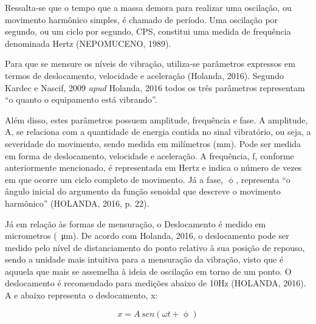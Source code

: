 \documentclass[
	12pt,				
	oneside,			
	a4paper,			
	english,			
	brazil,			
	]{abntex2ppgsi}
\begin{document}
Ressalta-se que o tempo que a massa demora para realizar uma oscilação, ou movimento harmônico simples, é chamado de período. Uma oscilação por segundo, ou um ciclo por segundo, CPS, constitui uma medida de frequência denominada Hertz (NEPOMUCENO, 1989). 



Para que se mensure os níveis de vibração, utiliza-se parâmetros expressos em termos de deslocamento, velocidade e aceleração (Holanda, 2016). Segundo Kardec e Nascif, 2009 \textit{apud} Holanda, 2016 todos os três parâmetros representam “o quanto o equipamento está vibrando”. 

Além disso, estes parâmetros possuem amplitude, frequência e fase. A amplitude, A, se relaciona com a quantidade de energia contida no sinal vibratório, ou seja, a severidade do movimento, sendo medida em milímetros (mm). Pode ser medida em forma de deslocamento, velocidade e aceleração. A frequência, f, conforme anteriormente mencionado, é representada em Hertz e indica o número de vezes em que ocorre um ciclo completo de movimento. Já a fase, $\upphi$, representa “o ângulo inicial do argumento da função senoidal que descreve o movimento harmônico” (HOLANDA, 2016, p. 22).

Já em relação às formas de mensuração, o Deslocamento é medido em micrometros (\SI{}{\micro\metre}). De acordo com Holanda, 2016, o deslocamento pode ser medido pelo nível de distanciamento do ponto relativo à sua posição de repouso, sendo a unidade mais intuitiva para a mensuração da vibração, visto que é aquuela que mais se assemelha à ideia de oscilação em torno de um ponto. O deslocamento é recomendado para medições abaixo de 10Hz (HOLANDA, 2016). A e abaixo representa o deslocamento, x:

\begin{equation}
	x = A \,sen (\omega t + \upphi)
	\label{eq:Equação de deslocamento}
\end{equation}
\end{document}

